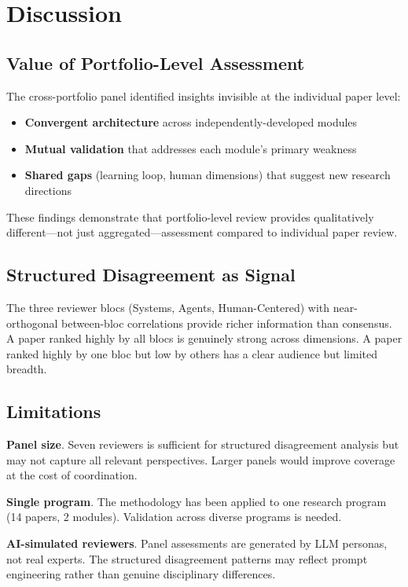 \section{Discussion}

\subsection{Value of Portfolio-Level Assessment}

The cross-portfolio panel identified insights invisible at the individual paper level:
\begin{itemize}
    \item \textbf{Convergent architecture} across independently-developed modules
    \item \textbf{Mutual validation} that addresses each module's primary weakness
    \item \textbf{Shared gaps} (learning loop, human dimensions) that suggest new research directions
\end{itemize}

These findings demonstrate that portfolio-level review provides qualitatively different---not just aggregated---assessment compared to individual paper review.

\subsection{Structured Disagreement as Signal}

The three reviewer blocs (Systems, Agents, Human-Centered) with near-orthogonal between-bloc correlations provide richer information than consensus. A paper ranked highly by all blocs is genuinely strong across dimensions. A paper ranked highly by one bloc but low by others has a clear audience but limited breadth.

\subsection{Limitations}

\textbf{Panel size}. Seven reviewers is sufficient for structured disagreement analysis but may not capture all relevant perspectives. Larger panels would improve coverage at the cost of coordination.

\textbf{Single program}. The methodology has been applied to one research program (14 papers, 2 modules). Validation across diverse programs is needed.

\textbf{AI-simulated reviewers}. Panel assessments are generated by LLM personas, not real experts. The structured disagreement patterns may reflect prompt engineering rather than genuine disciplinary differences.

